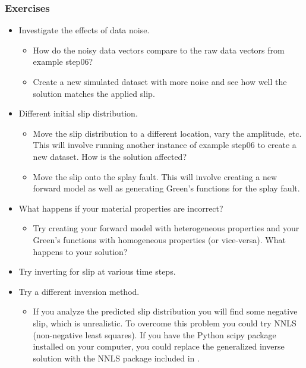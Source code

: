 \subsubsection{Exercises}

\begin{itemize}
\item Investigate the effects of data noise.
  \begin{itemize}
  \item How do the noisy data vectors compare to the raw data vectors
    from example step06?
  \item Create a new simulated dataset with more noise and see how
    well the solution matches the applied slip.
  \end{itemize}
\item Different initial slip distribution.
  \begin{itemize}
  \item Move the slip distribution to a different location, vary the
    amplitude, etc. This will involve running another instance of example
    step06 to create a new dataset. How is the solution affected?
  \item Move the slip onto the splay fault. This will involve creating
    a new forward model as well as generating Green's functions for the
    splay fault.
  \end{itemize}
\item What happens if your material properties are incorrect?
  \begin{itemize}
  \item Try creating your forward model with heterogeneous properties
    and your Green's functions with homogeneous properties (or
    vice-versa). What happens to your solution?
  \end{itemize}
\item Try inverting for slip at various time steps.
\item Try a different inversion method.
  \begin{itemize}
  \item If you analyze the predicted slip distribution you will find
    some negative slip, which is unrealistic. To overcome this problem
    you could try NNLS (non-negative least squares). If you have the
    Python scipy package installed on your computer, you could replace
    the generalized inverse solution with the NNLS package included in
    .
  \end{itemize}
\end{itemize}

